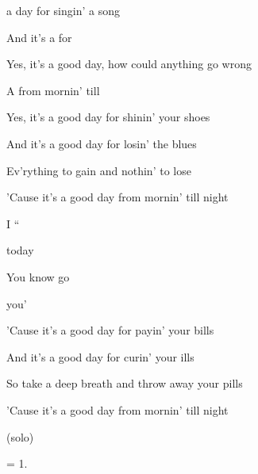 
\zs
{} a  day for singin' a song

And it's a  for  

Yes, it's a good day, how could anything go wrong

A  from mornin' till 
\ks

\zs 
Yes, it's a good day for shinin' your shoes 

And it's a good day for losin' the blues 

Ev'rything to gain and nothin' to lose 

'Cause it's a good day from mornin' till night 
\ks

\zr
I  `` 

 today 

You know  go   


 you' 
\kr

\zs
'Cause it's a good day for payin' your bills 

And it's a good day for curin' your ills 

So take a deep breath and throw away your pills 

'Cause it's a good day from mornin' till night 
\ks

(solo)

\zr
\kr

\zs
= 1.
\ks

\kp
